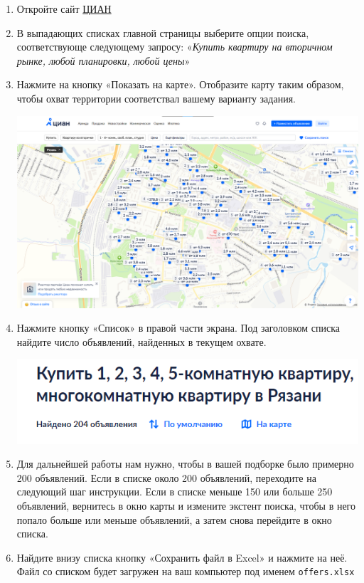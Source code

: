 \documentclass[
  12pt,
]{book}
\begin{document}
\begin{enumerate}
\def\labelenumi{\arabic{enumi}.}
\item
  Откройте сайт \href{https://www.cian.ru/}{ЦИАН}
\item
  В выпадающих списках главной страницы выберите опции поиска, соответствующе следующему запросу: «\emph{Купить квартиру на вторичном рынке, любой планировки, любой цены}»
\item
  Нажмите на кнопку «Показать на карте». Отобразите карту таким образом, чтобы охват территории соответствал вашему варианту задания.

  \includegraphics{images/Ex08_Geocoding/cian01.png}
\item
  Нажмите кнопку «Список» в правой части экрана. Под заголовком списка найдите число объявлений, найденных в текущем охвате.

  \includegraphics{images/Ex08_Geocoding/cian02.png}
\item
  Для дальнейшей работы нам нужно, чтобы в вашей подборке было примерно 200 объявлений. Если в списке около 200 объявлений, переходите на следующий шаг инструкции. Если в списке меньше 150 или больше 250 объявлений, вернитесь в окно карты и измените экстент поиска, чтобы в него попало больше или меньше объявлений, а затем снова перейдите в окно списка.
\item
  Найдите внизу списка кнопку «Сохранить файл в Excel» и нажмите на неё. Файл со списком будет загружен на ваш компьютер под именем \texttt{offers.xlsx}


\end{enumerate}
\end{document}
